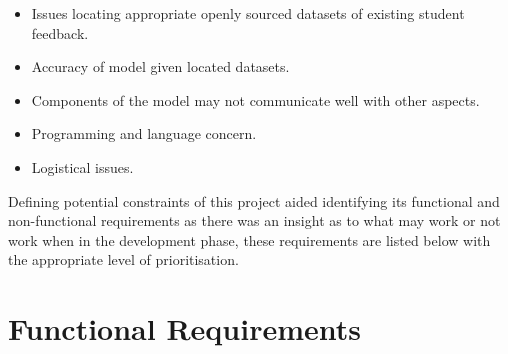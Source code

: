 \begin{itemize}
    \item Issues locating appropriate openly sourced datasets of existing student feedback.
    \item Accuracy of model given located datasets.
    \item Components of the model may not communicate well with other aspects.
    \item Programming and language concern.
    \item Logistical issues.
\end{itemize}

Defining potential constraints of this project aided identifying its functional and non-functional requirements as there was an insight as to what may work or not work when in the development phase, these requirements are listed below with the appropriate level of prioritisation.

\section{Functional Requirements}

